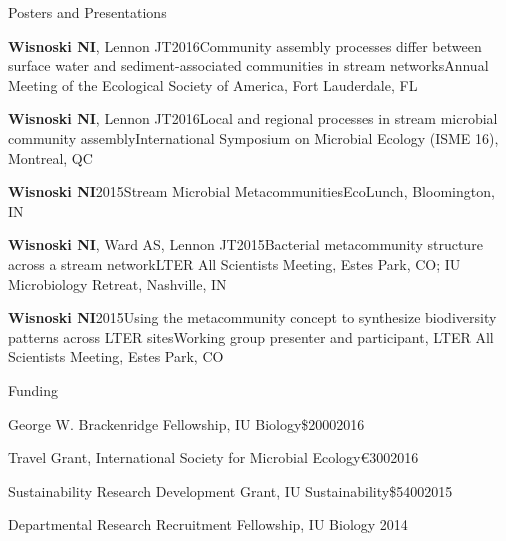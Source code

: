 \documentclass{resume} %
\begin{document}
\begin{rSection}{Posters and Presentations}

  \begin{Publication}{{\bf Wisnoski NI}, Lennon JT}{2016}{Community assembly processes differ between surface water and sediment-associated communities in stream networks}{Annual Meeting of the Ecological Society of America, Fort Lauderdale, FL}
  \end{Publication}
  
  \begin{Publication}{{\bf Wisnoski NI}, Lennon JT}{2016}{Local and regional processes in stream microbial community assembly}{International Symposium on Microbial Ecology (ISME 16), Montreal, QC}
  \end{Publication}

  \begin{Publication}{\bf Wisnoski NI}{2015}{Stream Microbial Metacommunities}{EcoLunch, Bloomington, IN}
  \end{Publication}

  \begin{Publication}{{\bf Wisnoski NI}, Ward AS, Lennon JT}{2015}{Bacterial metacommunity structure across a stream network}{LTER All Scientists Meeting, Estes Park, CO;  IU Microbiology Retreat, Nashville, IN}
  \end{Publication}

  \begin{Publication}{\bf Wisnoski NI}{2015}{Using the metacommunity concept to synthesize biodiversity patterns across LTER sites}{Working group presenter and participant, LTER All Scientists Meeting, Estes Park, CO}

  \end{Publication}


\end{rSection}


\begin{rSection}{Funding}

\begin{Grant}{George W. Brackenridge Fellowship, IU Biology}{\$2000}{2016}
\end{Grant}

\begin{Grant}{Travel Grant, International Society for Microbial Ecology}{\euro{}300}{2016}
\end{Grant}

\begin{Grant}{Sustainability Research Development Grant, IU Sustainability}{\$5400}{2015}
\end{Grant}

\begin{Grant}{Departmental Research Recruitment Fellowship, IU Biology}{ }{2014}
\end{Grant}

\end{rSection}
\end{document}
